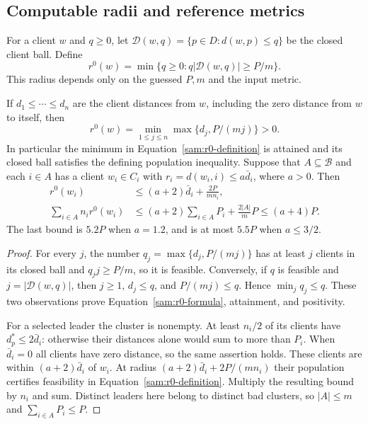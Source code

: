 \subsection{Computable radii and reference metrics}

For a client $w$ and $q\ge0$, let
$\mathcal D(w,q)=\{p\in D:d(w,p)\le q\}$ be the closed client ball.
Define
\begin{equation}
 r^0(w)=\min\{q\ge0:q|\mathcal D(w,q)|\ge P/m\}.
 \label{sam:r0-definition}
\end{equation}
This radius depends only on the guessed $P,m$ and the input metric.

\begin{lemma}\label{sam:computable-radius}
If $d_1\le\cdots\le d_n$ are the client distances from $w$, including the
zero distance from $w$ to itself, then
\begin{equation}
 r^0(w)=\min_{1\le j\le n}\max\{d_j,P/(mj)\}>0.
 \label{sam:r0-formula}
\end{equation}
In particular the minimum in Equation~\eqref{sam:r0-definition} is
attained and its closed ball satisfies the defining population inequality.
Suppose that $A\subseteq\mathcal B$ and each $i\in A$ has a client
$w_i\in C_i$ with $r_i=d(w_i,i)\le a\bar d_i$, where $a>0$.  Then
\begin{equation}
 \begin{aligned}
 r^0(w_i)&\le(a+2)\bar d_i+\frac{2P}{mn_i},\\
 \sum_{i\in A}n_i r^0(w_i)
 &\le(a+2)\sum_{i\in A}P_i+\frac{2|A|}{m}P
 \le(a+4)P.
 \end{aligned}
 \label{sam:leader-radius-sum}
\end{equation}
The last bound is $5.2P$ when $a=1.2$, and is at most $5.5P$ when
$a\le3/2$.
\end{lemma}

\begin{proof}
For every $j$, the number $q_j=\max\{d_j,P/(mj)\}$ has at least $j$
clients in its closed ball and $q_jj\ge P/m$, so it is feasible.  Conversely,
if $q$ is feasible and $j=|\mathcal D(w,q)|$, then $j\ge1$,
$d_j\le q$, and $P/(mj)\le q$.  Hence $\min_jq_j\le q$.  These two
observations prove Equation~\eqref{sam:r0-formula}, attainment, and
positivity.

For a selected leader the cluster is nonempty.  At least $n_i/2$ of its
clients have $d_p^*\le2\bar d_i$: otherwise their distances alone would
sum to more than $P_i$.  When $\bar d_i=0$ all clients have zero distance,
so the same assertion holds.  These clients are within
$(a+2)\bar d_i$ of $w_i$.  At radius
$(a+2)\bar d_i+2P/(mn_i)$ their population certifies feasibility in
Equation~\eqref{sam:r0-definition}.  Multiply the resulting bound by $n_i$
and sum.  Distinct leaders here belong to distinct bad clusters, so
$|A|\le m$ and $\sum_{i\in A}P_i\le P$.
\end{proof}

